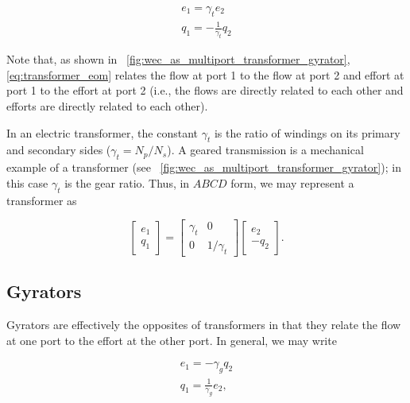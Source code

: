 \documentclass[lettersize,journal]{IEEEtran}
\begin{document}
\begin{subequations}
        \begin{align}
               e_1 = \gamma_{t} e_2 \\
               q_1 = -\frac{1}{\gamma_t} q_2
        \end{align}
        \label{eq:transformer_eom}
\end{subequations}

\noindent{}Note that, as shown in \figurename~\ref{fig:wec_as_multiport_transformer_gyrator}, \eqref{eq:transformer_eom} relates the flow at port 1 to the flow at port 2 and effort at port 1 to the effort at port 2 (i.e., the flows are directly related to each other and efforts are directly related to each other).

In an electric transformer, the constant $\gamma_t$ is the ratio of windings on its primary and secondary sides ($\gamma_t=N_p/N_s$).
A geared transmission is a mechanical example of a transformer (see \figurename~\ref{fig:wec_as_multiport_transformer_gyrator}); in this case $\gamma_{t}$ is the gear ratio.
Thus, in $ABCD$ form, we may represent a transformer as

\begin{equation}
        \begin{bmatrix}
                e_1 \\ q_1
        \end{bmatrix}
        =
        \begin{bmatrix}
                \gamma_{t} & 0 \\ 0 & 1/\gamma_{t}
        \end{bmatrix}
        \begin{bmatrix}
                e_2 \\ - q_2
        \end{bmatrix} .
        \label{eq:transformer_abcd}
\end{equation}

\subsection{Gyrators}\label{sec:gyrators}
Gyrators are effectively the opposites of transformers in that they relate the flow at one port to the effort at the other port.
In general, we may write

\begin{subequations}
        \begin{align}
               e_1 = - \gamma_g q_2 \\
               q_1 = \frac{1}{\gamma_g} e_2 ,
        \end{align}
        \label{eq:gyrator_eom}
\end{subequations}
\end{document}

